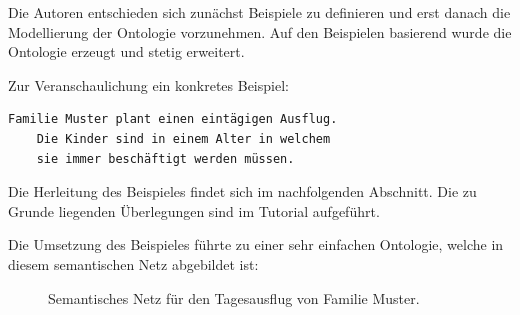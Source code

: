 Die Autoren entschieden sich zunächst Beispiele zu definieren und erst danach die Modellierung der Ontologie vorzunehmen. Auf den Beispielen basierend wurde die Ontologie erzeugt und stetig erweitert. 

Zur Veranschaulichung ein konkretes Beispiel:

\begin{lstlisting}[caption={Konkretes Beispiel einer Reiseplanung.},captionpos=b]
    Familie Muster plant einen eintägigen Ausflug.
    Die Kinder sind in einem Alter in welchem 
    sie immer beschäftigt werden müssen.
\end{lstlisting}

Die Herleitung des Beispieles findet sich im nachfolgenden Abschnitt. Die zu Grunde liegenden Überlegungen sind im Tutorial aufgeführt.

\newpage

Die Umsetzung des Beispieles führte zu einer sehr einfachen Ontologie, welche in diesem semantischen Netz abgebildet ist:
\begin{figure}[H]
    \centering {}
    \caption{Semantisches Netz für den Tagesausflug von Familie Muster.\label{fig:famMuster}\protect\footnotemark}
\end{figure}

